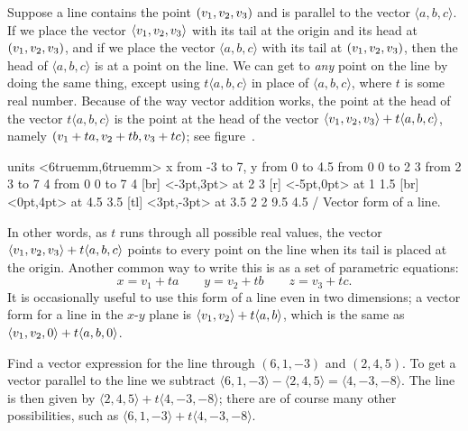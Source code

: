 Suppose a line contains the point $\displaystyle (v_1,v_2,v_3)$ and is parallel
to the vector $\langle a,b,c\rangle$. If we place the vector $\displaystyle
\langle v_1,v_2,v_3\rangle$ with its tail at the origin and its head
at $\displaystyle (v_1,v_2,v_3)$, and if we place the vector $\langle
a,b,c\rangle$ with its tail at $\displaystyle (v_1,v_2,v_3)$, then the head of
$\langle a,b,c\rangle$ is at a point on the line. We can get to {\em
  any\/} point on the line by doing the same thing, except using
$t\langle a,b,c\rangle$ in place of $\langle a,b,c\rangle$, where $t$
is some real number. Because of the way vector addition works, the
point at the head of the vector $t\langle a,b,c\rangle$ is the point
at the head of the vector $\displaystyle \langle v_1,v_2,v_3\rangle+t\langle
a,b,c\rangle$, namely $\displaystyle (v_1+ta,v_2+tb,v_3+tc)$; see
figure~.

\figure
\texonly
\vbox{\beginpicture
\normalgraphs
\ninepoint
\setcoordinatesystem units <6truemm,6truemm>
\setplotarea x from -3 to 7, y from 0 to 4.5
\arrow <4pt> [0.35, 1] from 0 0 to 2 3
\arrow <4pt> [0.35, 1] from 2 3 to 7 4
\arrow <4pt> [0.35, 1] from 0 0 to 7 4
 [br] <-3pt,3pt> at 2 3
 [r] <-5pt,0pt> at 1 1.5
 [br] <0pt,4pt> at 4.5 3.5
 [tl]
  <3pt,-3pt> at 3.5 2
\setdashes
{} 2 9.5 4.5 /
\endpicture}
\endtexonly
{}
\begincaption
Vector form of a line.
\endcaption
\endfigure

In other words, as $t$ runs through all possible real values, the
vector $\displaystyle \langle v_1,v_2,v_3\rangle+t\langle a,b,c\rangle$ points to
every point on the line when its tail is placed at the origin. Another
common way to write this is as a set of 
{\dfont parametric equations\/}:
$$ x= v_1+ta\qquad y=v_2+tb \qquad z=v_3+tc.$$
It is occasionally useful to use this form of a line even in two
dimensions; a vector form for a line in the $x$-$y$ plane is
$\displaystyle \langle v_1,v_2\rangle+t\langle a,b\rangle$, which is the same as
$\displaystyle \langle v_1,v_2,0\rangle+t\langle a,b,0\rangle$.

\example Find a vector expression for the line through $(6,1,-3)$ and
$(2,4,5)$. To get a vector parallel to the line we subtract $\langle
6,1,-3\rangle-\langle2,4,5\rangle=\langle 4,-3,-8\rangle$.  The line
is then given by $\langle 2,4,5\rangle+t\langle 4,-3,-8\rangle$; there
are of course many other possibilities, such as $\langle
6,1,-3\rangle+t\langle 4,-3,-8\rangle$.
\endexample

